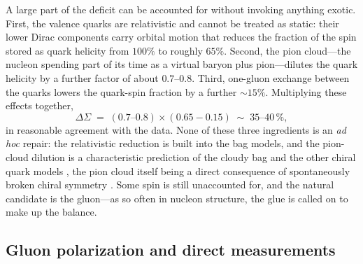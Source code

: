A large part of the deficit can be accounted for without invoking anything exotic. First,
the valence quarks are relativistic and cannot be treated as static: their lower Dirac
components carry orbital motion that reduces the fraction of the spin stored as quark
helicity from $100\%$ to roughly $65\%$. Second, the pion cloud---the nucleon spending
part of its time as a virtual baryon plus pion---dilutes the quark helicity by a further
factor of about $0.7$--$0.8$. Third, one-gluon exchange between the quarks lowers the
quark-spin fraction by a further $\sim 15\%$. Multiplying these effects together,
\begin{equation}
    \Delta\Sigma \;=\; (0.7\text{--}0.8)\times(0.65 - 0.15) \;\sim\; 35\text{--}40\,\%,
    \label{eq:spin-estimate}
\end{equation}
in reasonable agreement with the data. None of these three ingredients is an \emph{ad
hoc} repair: the relativistic reduction is built into the bag models, and the pion-cloud
dilution is a characteristic prediction of the cloudy bag and the other chiral quark
models \cite[Ch.~8]{ThomasWeise2001}, the pion cloud itself being a direct consequence of
spontaneously broken chiral symmetry \cite[Ch.~7]{ThomasWeise2001}. Some spin is still
unaccounted for, and the natural candidate is the gluon---as so often in nucleon
structure, the glue is called on to make up the balance.

\FloatBarrier

\subsection{Gluon polarization and direct measurements}
\label{subsec:gluon-polarization}

